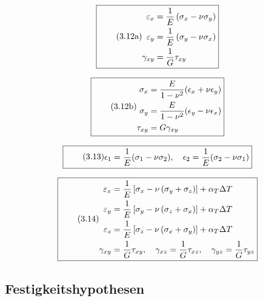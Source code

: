 \documentclass[11pt]{article}
\newcommand{\1}{ {\mathds{1}} }
\begin{document}
\begin{multicols}{2}
		\begin{equation}
			\boxed{
				\tag{3.12a}
				\begin{split}
					\varepsilon_x &= \frac{1}{E}\left(\sigma_x - \nu \sigma_y\right)
					\\
					\varepsilon_y &= \frac{1}{E}\left(\sigma_y - \nu \sigma_x\right)
					\\
			\gamma_{xy} &= \frac{1}{G}\tau_{xy}
				\end{split}
			}
		\end{equation}

		\begin{equation}
			\boxed{
				\tag{3.12b}
				\begin{split}
					\sigma_x &= \frac{E}{1 - \nu^2}(\epsilon_x + \nu \epsilon_y) \\
					\sigma_y &= \frac{E}{1 -\nu^2}(\epsilon_y - \nu \epsilon_x) \\
					\tau_{xy} &= G \gamma_{xy}
				\end{split}
			}
		\end{equation}

		\begin{equation}
			\boxed{
				\tag{3.13}
				\begin{split}
					\epsilon_1 = \frac{1}{E}(\sigma_1 -\nu\sigma_2), \quad \epsilon_2 = \frac{1}{E}(\sigma_2 -\nu\sigma_1)
				\end{split}
			}
		\end{equation}

		\begin{equation}
			\boxed{
				\tag{3.14}
				\begin{split}
					\varepsilon_x &= \frac{1}{E}\left[\sigma_x -\nu   \left(\sigma_y + \sigma_z\right)\right] + \alpha_T\Delta T
					\\
					\varepsilon_y &= \frac{1}{E}\left[\sigma_y -\nu   \left(\sigma_z + \sigma_x\right)\right] + \alpha_T\Delta T\\
					\varepsilon_z &= \frac{1}{E}\left[\sigma_z -\nu   \left(\sigma_x + \sigma_y\right)\right] + \alpha_T\Delta T\\
					\gamma_{xy} &= \frac{1}{G}\tau_{xy}, \quad \gamma_{xz} = \frac{1}{G}\tau_{xz}, \quad \gamma_{yz} = \frac{1}{G}\tau_{yz}
				\end{split}
			}
		\end{equation}

		\subsection{Festigkeitshypothesen}


\end{multicols}
\end{document}
